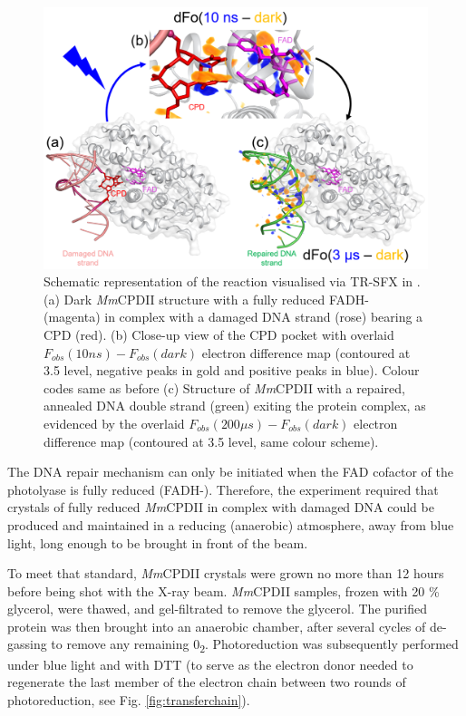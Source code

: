 \begin{figure}[H]
  \centering
  \includegraphics[width=\textwidth]{images/cracry/Science2023.pdf}
  \hfill
  \caption{Schematic representation of the reaction visualised via TR-SFX in \cite{maestre-reynaVisualizingDNARepair2023a}. (a) Dark \textit{Mm}CPDII structure with a fully reduced FADH- (magenta) in complex with a damaged DNA strand (rose) bearing a CPD (red). (b) Close-up view of the CPD pocket with overlaid \(F_{obs}(10 ns) - F_{obs}(dark)\) electron difference map (contoured at 3.5 \textsigma level, negative peaks in gold and positive peaks in blue). Colour codes same as before (c) Structure of \textit{Mm}CPDII with a repaired, annealed DNA double strand (green) exiting the protein complex, as evidenced by the overlaid \(F_{obs}(200 \mu s) - F_{obs}(dark)\) electron difference map (contoured at 3.5 \textsigma level, same colour scheme).}\label{fig:DNArepair_schem}
\end{figure}

The DNA repair mechanism can only be initiated when the FAD cofactor of the photolyase is fully reduced (FADH-). Therefore, the experiment required that crystals of fully reduced \textit{Mm}CPDII in complex with damaged DNA could be produced and maintained in a reducing (anaerobic) atmosphere, away from blue light, long enough to be brought in front of the beam. 

To meet that standard, \textit{Mm}CPDII crystals were grown no more than 12 hours before being shot with the X-ray beam. \textit{Mm}CPDII samples, frozen with 20 \% glycerol, were thawed, and gel-filtrated to remove the glycerol. The purified protein was then brought into an anaerobic chamber, after several cycles of de-gassing to remove any remaining 0\textsubscript{2}. Photoreduction was subsequently performed under blue light and with DTT (to serve as the electron donor needed to regenerate the last member of the electron chain between two rounds of photoreduction, see Fig. \ref{fig:transferchain}). 

